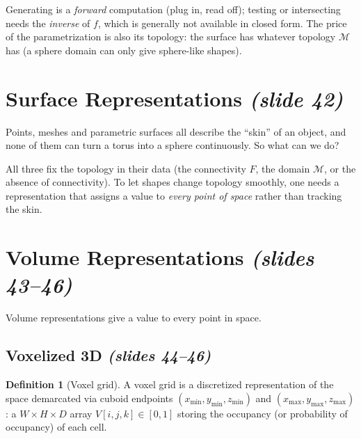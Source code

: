 \documentclass[11pt,a4paper]{article}
\newcommand{\M}{\mathcal{M}}
\theoremstyle{definition}
\newtheorem{definition}{Definition}[section]
\theoremstyle{plain}
\theoremstyle{remark}
\newcommand{\slides}[1]{\texorpdfstring{\emph{(#1)}}{(#1)}}
\begin{document}
\begin{intuition}
Generating is a \emph{forward} computation (plug in, read off); testing or intersecting needs the \emph{inverse} of $f$, which is generally not available in closed form. The price of the parametrization is also its topology: the surface has whatever topology $\M$ has (a sphere domain can only give sphere-like shapes).
\end{intuition}

\section{Surface Representations \slides{slide 42}}

Points, meshes and parametric surfaces all describe the ``skin'' of an object, and none of them can turn a torus into a sphere continuously. So what can we do?

\begin{intuition}
All three fix the topology in their data (the connectivity $F$, the domain $\M$, or the absence of connectivity). To let shapes change topology smoothly, one needs a representation that assigns a value to \emph{every point of space} rather than tracking the skin.
\end{intuition}

\section{Volume Representations \slides{slides 43--46}}

Volume representations give a value to every point in space.

\subsection{Voxelized 3D \slides{slides 44--46}}
\begin{definition}[Voxel grid]
A voxel grid is a discretized representation of the space demarcated via cuboid endpoints $(x_{\min},y_{\min},z_{\min})$ and $(x_{\max},y_{\max},z_{\max})$: a $W\times H\times D$ array $V[i,j,k]\in[0,1]$ storing the occupancy (or probability of occupancy) of each cell.
\end{definition}
\end{document}
